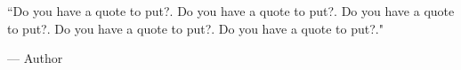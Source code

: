\pagestyle{empty} %

\null\vfill\vfill\vfill %

\setlength\epigraphwidth{12cm}
\setlength\epigraphrule{0pt}
\epigraph{``Do you have a quote to put?. Do you have a quote to put?. Do you have a quote to put?. Do you have a quote to put?. Do you have a quote to put?."}{--- \textup{Author}}
\setlength\epigraphwidth{8cm}
\setlength\epigraphrule{0pt}

\vfill\vfill\vfill\vfill\vfill\vfill\null %
\cleardoublepage %
